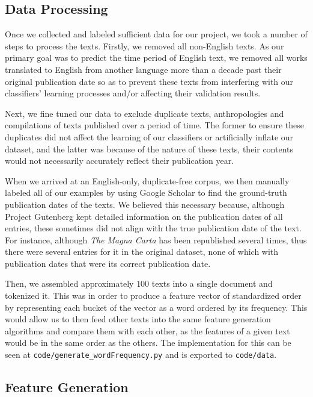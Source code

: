 \documentclass{article}
\begin{document}
\subsection{Data Processing}

Once we collected and labeled sufficient data for our project, we took a number of steps to process 
  the texts. Firstly, we removed all non-English texts. As our 
  primary goal was to predict the time period of English text,
  we removed all works translated to English from another language more than a decade past their 
  original publication date so as to prevent these texts from 
  interfering with our classifiers' learning processes and/or affecting their
  validation results. 

Next, we fine tuned our data to exclude duplicate texts, anthropologies 
  and compilations of texts published over a period of time. The former to ensure 
  these duplicates did not affect the learning of our classifiers
  or artificially inflate our dataset, and the latter was because of the nature of these texts, 
  their contents would not necessarily accurately reflect their publication year.

When we arrived at an English-only, duplicate-free corpus, we then manually labeled all of our examples by 
using Google Scholar to find the ground-truth publication dates 
of the texts. 
We believed this necessary because, although Project Gutenberg kept detailed information on 
the publication dates of all entries, these sometimes did not align with the true publication date 
of the text. For instance, although \textit{The Magna Carta} has been republished several times,
thus there were several entries for it in the original dataset, none of which
with publication dates that were its correct publication date. 

Then, we assembled approximately $100$ texts into a single document and tokenized it. This was in order 
to produce a feature vector of standardized order by representing each bucket of the vector as 
a word ordered by its frequency. This would allow us to then feed other texts into 
the same feature generation algorithms and compare them with each other, as the features of 
a given text would be in the same order as the others. The implementation for this can be seen at 
\verb|code/generate_wordFrequency.py| and is exported to \verb|code/data|.


\subsection{Feature Generation}
\end{document}
